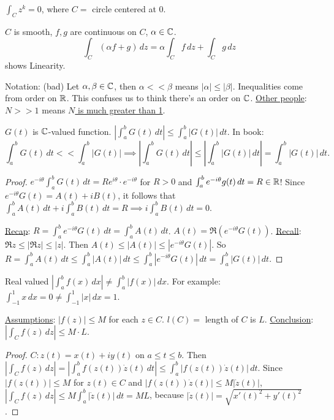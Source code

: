 \documentclass[]{article}
\begin{document}
\begin{example}
	$\int_C z^k = 0$, where $C = $ circle centered at 0.
\end{example}

\begin{proposition}
	$C$ is smooth, $f,g$ are continuous on $C$, $\alpha\in\mathbb{C}$. $$\int_C(\alpha f + g)\, dz = \alpha \int_C f \, dz + \int_C g \, dz$$ shows Linearity.
\end{proposition}

Notation: (bad) Let $\alpha, \beta\in\mathbb{C}$, then $\alpha << \beta$ means $|\alpha|\leq |\beta|$. Inequalities come from order on $\mathbb{R}$. This confuses us to think there's an order on $\mathbb{C}$. \underline{Other people}: $N>>1$ means \underline{$N$ is much greater than 1}.

\begin{lemma}
	$G(t)$ is $\mathbb{C}$-valued function. $\left| \int_a^b G(t) \, dt \right| \leq \int_a^b |G(t)| \,dt $. In book: $$\int_a^b G(t) \, dt << \int_a^b | G(t) | \implies \left| \int_a^b G(t) \, dt \right| \leq \left| \int_a^b |G(t)| \,dt \right| = \int_a^b |G(t)| \,dt .$$
\end{lemma}
\begin{proof}
	$e^{-i\theta} \int_a^b G(t) \, dt = R e^{i\theta}\cdot e^{-i\theta}$ for $R>0$ and $\int_a^b e^{-i\theta} g(t)\, dt = R \in\mathbb{R}$! Since $e^{-i\theta} G(t) = A(t) + iB(t)$, it follows that $\int_a^b A(t) \, dt + i\int_a^b B(t) \, dt = R \implies i\int_a^b B(t)\, dt = 0$.
	
	\underline{Recap}: $R = \int_a^b e^{-i\theta} G(t) \, dt = \int_a^b A(t) \, dt$. $A(t) = \Re(e^{-i\theta} G(t))$. \underline{Recall}: $\Re z \leq |\Re z| \leq |z|$. Then $A(t) \leq |A(t)| \leq |e^{-i\theta} G(t)|$.
	So $R = \int_a^b A(t) \, dt \leq \int_a^b |A(t) | \, dt \leq \int_a^b |e^{-i\theta} G(t) | \, dt = \int_a^b |G(t)| \, dt$.
\end{proof}
\begin{example}
	Real valued $\left| \int_a^b f(x) \, dx \right| \neq \int_a^b |f(x)| \, dx$. For example: $\int_{-1}^1 x\, dx = 0 \neq \int_{-1}^1 |x| \, dx = 1$.
\end{example}
\begin{theorem}
	[$M$-$L$ Formula] \underline{Assumptions}: $|f(z)|\leq M$ for each $z\in C$. $l(C) = $ length of $C$ is $L$. \underline{Conclusion}: $\left| \int_C f(z) \, dz \right| \leq M\cdot L$.
\end{theorem}
\begin{proof}
	$C:z(t) = x(t) + iy(t)$ on $a\leq t \leq b$. Then $\left| \int_C f(z) \, dz \right| = \left| \int_a^b f(z(t)) \dot{z}(t) \, dt \right| \leq \int_a^b | f(z(t))\dot{z}(t) | \, dt$. Since $|f(z(t))| \leq M$ for $z(t)\in C$ and $|f(z(t)) \dot{z}(t) | \leq M |\dot{z}(t)|$, $\left| \int_C f(z) \, dz \right| \leq M\int_a^b | \dot{z}(t) | \, dt = ML$, because $|\dot{z}(t) | = \sqrt{ x'(t)^2 + y'(t)^2}$.
\end{proof}
\end{document}
